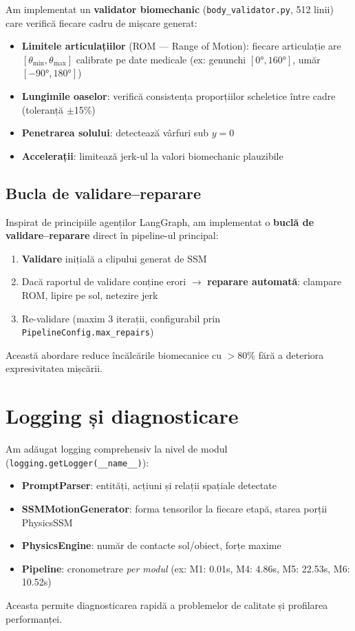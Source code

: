 Am implementat un \textbf{validator biomechanic} (\texttt{body\_validator.py}, 512 linii) care verifică fiecare cadru de mișcare generat:

\begin{itemize}
    \item \textbf{Limitele articulațiilor} (ROM --- Range of Motion): fiecare articulație are $[\theta_{\min}, \theta_{\max}]$ calibrate pe date medicale (ex: genu\-nchi $[0°, 160°]$, umăr $[-90°, 180°]$)
    \item \textbf{Lungimile oaselor}: verifică consistența proporțiilor scheletice între cadre (toleranță $\pm$15\%)
    \item \textbf{Penetrarea solului}: detectează vârfuri sub $y = 0$
    \item \textbf{Accelerații}: limitează jerk-ul la valori biomechanic plauzibile
\end{itemize}

\subsection{Bucla de validare--reparare}

Inspirat de principiile agenților LangGraph, am implementat o \textbf{buclă de validare--reparare} direct în pipeline-ul principal:

\begin{enumerate}
    \item \textbf{Validare} inițială a clipului generat de SSM
    \item Dacă raportul de validare conține erori $\rightarrow$ \textbf{reparare automată}: clampare ROM, lipire pe sol, nete\-zire jerk
    \item Re-validare (maxim 3 iterații, configurabil prin \texttt{PipelineConfig.max\_repairs})
\end{enumerate}

Această abordare reduce încălcările biomecanice cu $>$80\% fără a deteriora expresivitatea mișcării.

\section{Logging și diagnosticare}

Am adăugat logging comprehensiv la nivel de modul (\texttt{logging.getLogger(\_\_name\_\_)}):

\begin{itemize}
    \item \textbf{PromptParser}: entități, acțiuni și relații spațiale detectate
    \item \textbf{SSMMotionGenerator}: forma tensorilor la fiecare etapă, starea porții PhysicsSSM
    \item \textbf{PhysicsEngine}: număr de contacte sol/obiect, forțe maxime
    \item \textbf{Pipeline}: cronometrare \textit{per modul} (ex: M1: 0.01s, M4: 4.86s, M5: 22.53s, M6: 10.52s)
\end{itemize}

Aceasta permite diagnosticarea rapidă a problemelor de calitate și profilarea performanței.
